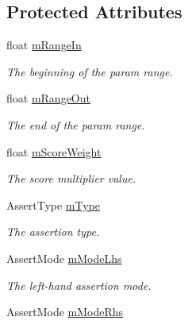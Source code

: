 \subsection*{Protected Attributes}
\begin{DoxyCompactItemize}
\item 
\hypertarget{class_assertion_af7bf1163869dbd06a4a813939de4ad10}{float \hyperlink{class_assertion_af7bf1163869dbd06a4a813939de4ad10}{m\-Range\-In}}\label{class_assertion_af7bf1163869dbd06a4a813939de4ad10}

\begin{DoxyCompactList}\small\item\em The beginning of the param range. \end{DoxyCompactList}\item 
\hypertarget{class_assertion_a715cdcfac591df490a6c48b303bc8f3b}{float \hyperlink{class_assertion_a715cdcfac591df490a6c48b303bc8f3b}{m\-Range\-Out}}\label{class_assertion_a715cdcfac591df490a6c48b303bc8f3b}

\begin{DoxyCompactList}\small\item\em The end of the param range. \end{DoxyCompactList}\item 
\hypertarget{class_assertion_a3b38db2afb97da13cc6b6e57780d8dc9}{float \hyperlink{class_assertion_a3b38db2afb97da13cc6b6e57780d8dc9}{m\-Score\-Weight}}\label{class_assertion_a3b38db2afb97da13cc6b6e57780d8dc9}

\begin{DoxyCompactList}\small\item\em The score multiplier value. \end{DoxyCompactList}\item 
\hypertarget{class_assertion_aa188ff1f3f8ab00cc76bc152ac55c2ed}{Assert\-Type \hyperlink{class_assertion_aa188ff1f3f8ab00cc76bc152ac55c2ed}{m\-Type}}\label{class_assertion_aa188ff1f3f8ab00cc76bc152ac55c2ed}

\begin{DoxyCompactList}\small\item\em The assertion type. \end{DoxyCompactList}\item 
\hypertarget{class_assertion_aaa36f2a3e47ab1fb4b87b11e70b0da2f}{Assert\-Mode \hyperlink{class_assertion_aaa36f2a3e47ab1fb4b87b11e70b0da2f}{m\-Mode\-Lhs}}\label{class_assertion_aaa36f2a3e47ab1fb4b87b11e70b0da2f}

\begin{DoxyCompactList}\small\item\em The left-\/hand assertion mode. \end{DoxyCompactList}\item 
\hypertarget{class_assertion_aea9edb490f08cfc22de5eaf3aed7992d}{Assert\-Mode \hyperlink{class_assertion_aea9edb490f08cfc22de5eaf3aed7992d}{m\-Mode\-Rhs}}\label{class_assertion_aea9edb490f08cfc22de5eaf3aed7992d}


\end{DoxyCompactItemize}
